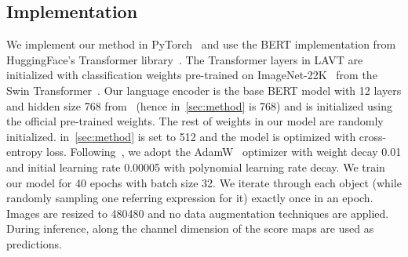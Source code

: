 \documentclass[10pt,twocolumn,letterpaper]{article}
\begin{document}
\subsection{Implementation}
\label{sec:implementation}
We implement our method in PyTorch~\cite{paszke2019pytorch} and use the BERT implementation from HuggingFace's Transformer library~\cite{wolf-2020-transformers}.
The Transformer layers in LAVT are initialized with classification weights pre-trained on ImageNet-22K~\cite{imgnet} from the Swin Transformer~\cite{Liu_2021_swin}.
Our language encoder is the base BERT model with 12 layers and hidden size 768 from~\cite{attention-all-you-need} (hence  in~\cref{sec:method} is 768) and is initialized using the official pre-trained weights.
The rest of weights in our model are randomly initialized.
 in~\cref{sec:method} is set to 512 and the model is optimized with cross-entropy loss.
Following~\cite{Liu_2021_swin}, we adopt the AdamW~\cite{loshchilov2017adamw} optimizer with weight decay 0.01 and initial learning rate 0.00005 with polynomial learning rate decay.
We train our model for 40 epochs with batch size 32.
We iterate through each object (while randomly sampling one referring expression for it) exactly once in an epoch.
Images are resized to 480480 and no data augmentation techniques are applied.
During inference,  along the channel dimension of the score maps are used as predictions.
\end{document}
